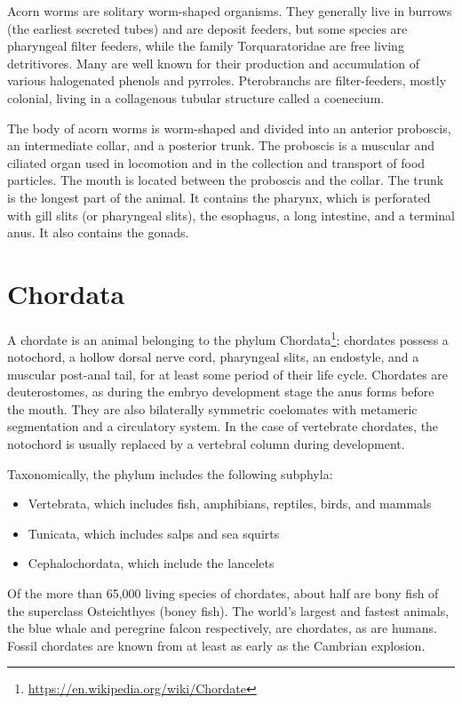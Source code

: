 \documentclass[]{book}
\providecommand{\tightlist}{%
  \setlength{\itemsep}{0pt}\setlength{\parskip}{0pt}}
\let\rmarkdownfootnote\footnote%
\def\footnote{\protect\rmarkdownfootnote}
\renewcommand{\href}[2]{#2\footnote{\url{#1}}}
\theoremstyle{definition}
\theoremstyle{definition}
\theoremstyle{definition}
\theoremstyle{remark}
\begin{document}
Acorn worms are solitary worm-shaped organisms. They generally live in
burrows (the earliest secreted tubes) and are deposit feeders, but some
species are pharyngeal filter feeders, while the family Torquaratoridae
are free living detritivores. Many are well known for their production
and accumulation of various halogenated phenols and pyrroles.
Pterobranchs are filter-feeders, mostly colonial, living in a
collagenous tubular structure called a coenecium.

The body of acorn worms is worm-shaped and divided into an anterior
proboscis, an intermediate collar, and a posterior trunk. The proboscis
is a muscular and ciliated organ used in locomotion and in the
collection and transport of food particles. The mouth is located between
the proboscis and the collar. The trunk is the longest part of the
animal. It contains the pharynx, which is perforated with gill slits (or
pharyngeal slits), the esophagus, a long intestine, and a terminal anus.
It also contains the gonads.

\section{Chordata}\label{chordata}

A chordate is an animal belonging to the phylum
\href{https://en.wikipedia.org/wiki/Chordate}{Chordata}; chordates
possess a notochord, a hollow dorsal nerve cord, pharyngeal slits, an
endostyle, and a muscular post-anal tail, for at least some period of
their life cycle. Chordates are deuterostomes, as during the embryo
development stage the anus forms before the mouth. They are also
bilaterally symmetric coelomates with metameric segmentation and a
circulatory system. In the case of vertebrate chordates, the notochord
is usually replaced by a vertebral column during development.

Taxonomically, the phylum includes the following subphyla:

\begin{itemize}
\tightlist
\item
  Vertebrata, which includes fish, amphibians, reptiles, birds, and
  mammals
\item
  Tunicata, which includes salps and sea squirts
\item
  Cephalochordata, which include the lancelets
\end{itemize}

Of the more than 65,000 living species of chordates, about half are bony
fish of the superclass Osteichthyes (boney fish). The world's largest
and fastest animals, the blue whale and peregrine falcon respectively,
are chordates, as are humans. Fossil chordates are known from at least
as early as the Cambrian explosion.
\end{document}
